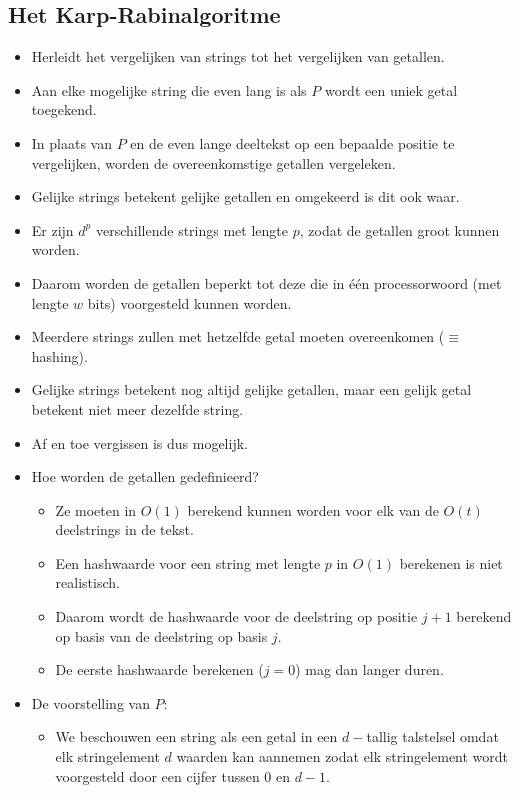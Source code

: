\subsection{Het Karp-Rabinalgoritme}
\begin{itemize}
    \item Herleidt het vergelijken van strings tot het vergelijken van getallen.
    \item Aan elke mogelijke string die even lang is als $P$ wordt een uniek getal toegekend.
    \item In plaats van $P$ en de even lange deeltekst op een bepaalde positie te vergelijken, worden de overeenkomstige getallen vergeleken.
    \item Gelijke strings betekent gelijke getallen en omgekeerd is dit ook waar.
    \item Er zijn $d^p$ verschillende strings met lengte $p$, zodat de getallen groot kunnen worden.
    \item Daarom worden de getallen beperkt tot deze die in één processorwoord (met lengte $w$ bits) voorgesteld kunnen worden.
    \item Meerdere strings zullen met hetzelfde getal moeten overeenkomen ($\equiv$ hashing).
    \item Gelijke strings betekent nog altijd gelijke getallen, maar een gelijk getal betekent niet meer dezelfde string.
    \item Af en toe vergissen is dus mogelijk.
    \item Hoe worden de getallen gedefinieerd?
    \begin{itemize}
        \item Ze moeten in $O(1)$ berekend kunnen worden voor elk van de $O(t)$ deelstrings in de tekst.
        \item Een hashwaarde voor een string met lengte $p$ in $O(1)$ berekenen is niet realistisch.
        \item Daarom wordt de hashwaarde voor de deelstring op positie $j + 1$ berekend op basis van de deelstring op basis $j$.
        \item De eerste hashwaarde berekenen ($j = 0$) mag dan langer duren.
    \end{itemize}
    

    \item De voorstelling van $P$:
    \begin{itemize}
        \item We beschouwen een string als een getal in een $d-$tallig talstelsel omdat elk stringelement $d$ waarden kan aannemen zodat elk stringelement wordt voorgesteld door een cijfer tussen 0 en $d - 1$.
        

\end{itemize}
\end{itemize}
